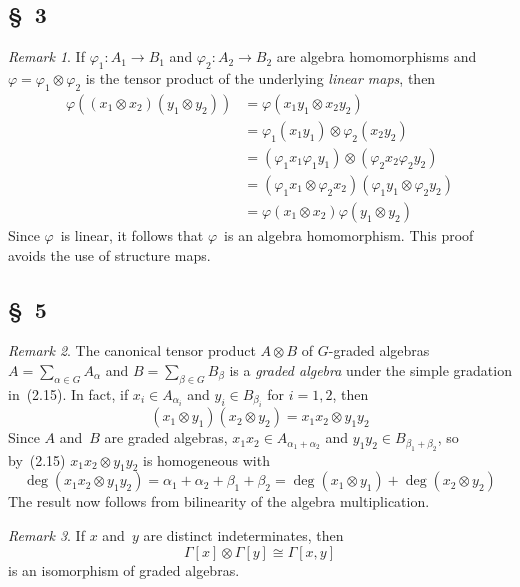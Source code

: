 \documentclass[letterpaper,12pt]{article}
\newcommand{\iso}{\cong}
\newcommand{\tprod}{\otimes}
\theoremstyle{definition}
\theoremstyle{remark}
\newtheorem*{rmk}{Remark}
\begin{document}
\subsection*{\S~3}
\begin{rmk}
If \(\varphi_1:A_1\to B_1\) and \(\varphi_2:A_2\to B_2\) are algebra homomorphisms and \(\varphi=\varphi_1\tprod\varphi_2\) is the tensor product of the underlying \emph{linear maps}, then
\begin{align*}
\varphi((x_1\tprod x_2)(y_1\tprod y_2))&=\varphi(x_1y_1\tprod x_2y_2)\\
	&=\varphi_1(x_1y_1)\tprod\varphi_2(x_2y_2)\\
	&=(\varphi_1x_1\varphi_1y_1)\tprod(\varphi_2x_2\varphi_2y_2)\\
	&=(\varphi_1x_1\tprod\varphi_2 x_2)(\varphi_1y_1\tprod\varphi_2 y_2)\\
	&=\varphi(x_1\tprod x_2)\varphi(y_1\tprod y_2)
\end{align*}
Since \(\varphi\)~is linear, it follows that \(\varphi\)~is an algebra homomorphism. This proof avoids the use of structure maps.
\end{rmk}

\subsection*{\S~5}
\begin{rmk}
The canonical tensor product \(A\tprod B\) of \(G\)-graded algebras \(A=\sum_{\alpha\in G}A_{\alpha}\) and \(B=\sum_{\beta\in G}B_{\beta}\) is a \emph{graded algebra} under the simple gradation in~(2.15). In fact, if \(x_i\in A_{\alpha_i}\) and \(y_i\in B_{\beta_i}\) for \(i=1,2\), then
\[(x_1\tprod y_1)(x_2\tprod y_2)=x_1x_2\tprod y_1y_2\]
Since \(A\) and~\(B\) are graded algebras, \(x_1x_2\in A_{\alpha_1+\alpha_2}\) and \(y_1y_2\in B_{\beta_1+\beta_2}\), so by~(2.15) \(x_1x_2\tprod y_1y_2\) is homogeneous with
\[\deg(x_1x_2\tprod y_1y_2)=\alpha_1+\alpha_2+\beta_1+\beta_2=\deg(x_1\tprod y_1)+\deg(x_2\tprod y_2)\]
The result now follows from bilinearity of the algebra multiplication.
\end{rmk}

\begin{rmk}
If \(x\) and~\(y\) are distinct indeterminates, then
\[\Gamma[x]\tprod\Gamma[y]\iso\Gamma[x,y]\]
is an isomorphism of graded algebras.
\end{rmk}

\newpage
\end{document}
